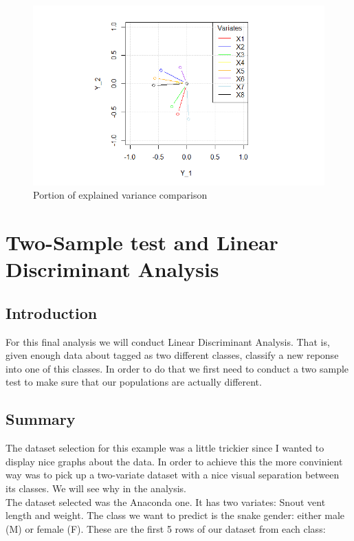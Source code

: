 \documentclass[11pt,a4paper]{article}
\begin{document}
	\begin{figure}[H] 
		\centering
		\includegraphics[scale=.9]{./pics/PCA3}
		\caption{Portion of explained variance comparison} \label{contributions-label}
	\end{figure}

	
	
	\section{Two-Sample test and Linear Discriminant Analysis}
	
	\subsection{Introduction}
	
	For this final analysis we will conduct Linear Discriminant Analysis. That is, given enough data about tagged as two different classes, classify a new reponse into one of this classes. In order to do that we first need to conduct a two sample test to make sure that our populations are actually different.
	
	\subsection{Summary}
	
	The dataset selection for this example was a little trickier since I wanted to display nice graphs about the data. In order to achieve this the more convinient way was to pick up a two-variate dataset with a nice visual separation between its classes. We will see why in the analysis. \\
	
	The dataset selected was the Anaconda one. It has two variates: Snout vent length and weight. The class we want to predict is the snake gender: either male (M) or female (F). These are the first 5 rows of our dataset from each class:
	
\end{document}
